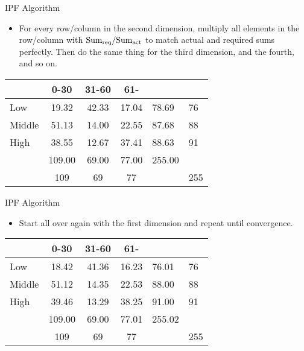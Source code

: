 \documentclass{beamer}
\begin{document}
\begin{frame}{IPF Algorithm}
\begin{itemize}
\item For every row/column in the second dimension, multiply all
  elements in the row/column with \(\text{Sum}_{\text{req}}{}/\text{Sum}_{\text{act}}{}\)
  to match actual and required sums perfectly. Then do the same thing
  for the third dimension, and the fourth, and so on.
\end{itemize}

\begin{table}
\centering
\begin{tabular}{l||c c c||l|l}
 & 0-30 & 31-60 & 61- & \sumact{} & \sumreq{}\\
\hline \hline
Low & 19.32 & 42.33 & 17.04 & 78.69 & 76 \\
Middle & 51.13 & 14.00 & 22.55 & 87.68 & 88 \\
High & 38.55 & 12.67 & 37.41 & 88.63 & 91 \\
\hline \hline
\sumact{} & 109.00 & 69.00 & 77.00 & 255.00 & \\
\hline
\sumreq{} & 109 & 69 & 77 & & 255 \\
\end{tabular}
\end{table}
\end{frame}


\begin{frame}{IPF Algorithm}
\begin{itemize}
\item Start all over again with the first dimension and repeat until
  convergence.
\end{itemize}

\begin{table}
\centering
\begin{tabular}{l||c c c||l|l}
         &   0-30 & 31-60 & 61- & \sumact{} & \sumreq{}\\
\hline \hline
Low      &  18.42 & 41.36 & 16.23 & 76.01 & 76 \\
Middle   &  51.12 & 14.35 & 22.53 & 88.00 & 88 \\
High     &  39.46 & 13.29 & 38.25 & 91.00 & 91 \\
\hline \hline
\sumact{}& 109.00 & 69.00 & 77.01 & 255.02 & \\
\hline
\sumreq{}& 109    & 69 & 77 & & 255 \\
\end{tabular}
\end{table}
\end{frame}
\end{document}
